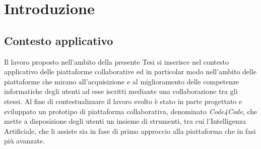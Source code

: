 \chapter{Introduzione}

\section{Contesto applicativo} %
Il lavoro proposto nell'ambito della presente Tesi si inserisce nel contesto applicativo delle piattaforme collaborative ed in particolar modo nell'ambito delle piattaforme che mirano all'acquisizione e al miglioramento delle competenze informatiche degli utenti ad esse iscritti mediante una collaborazione tra gli stessi. Al fine di contestualizzare il lavoro svolto è stato in parte progettato e sviluppato un prototipo di piattaforma collaborativa, denominato \emph{Code4Code}, che mette a disposizione degli utenti un insieme di strumenti, tra cui l'Intelligenza Artificiale, che li assiste sia in fase di primo approccio alla piattaforma che in fasi più avanzate.  
